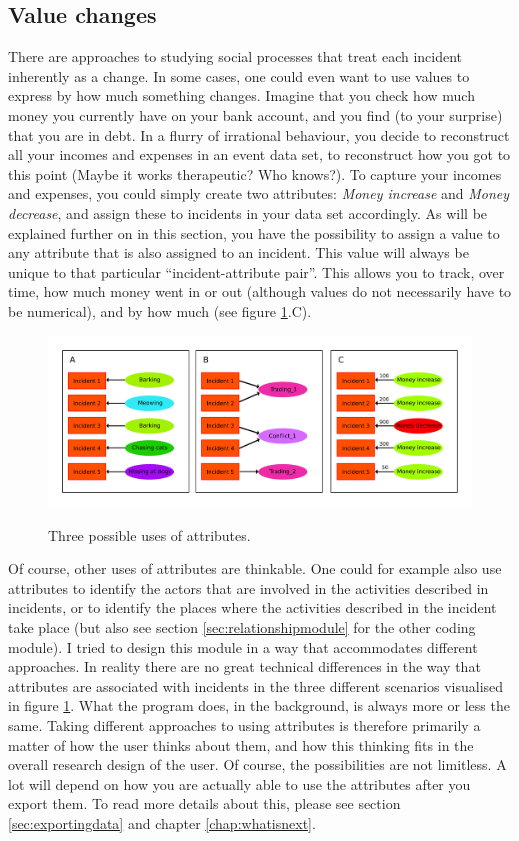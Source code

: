 \documentclass{memoir}
\begin{document}
  \subsection{Value changes}
\label{sec:valuechanges}
There are approaches to studying social processes that treat each incident inherently as a change. In some cases, one could even want to use values to express by how much something changes. Imagine that you check how much money you currently have on your bank account, and you find (to your surprise) that you are in debt. In a flurry of irrational behaviour, you decide to reconstruct all your incomes and expenses in an event data set, to reconstruct how you got to this point (Maybe it works therapeutic? Who knows?). To capture your incomes and expenses, you could simply create two attributes: \emph{Money increase} and \emph{Money decrease}, and assign these to incidents in your data set accordingly. As will be explained further on in this section, you have the possibility to assign a value to any attribute that is also assigned to an incident. This value will always be unique to that particular ``incident-attribute pair''. This allows you to track, over time, how much money went in or out (although values do not necessarily have to be numerical), and by how much (see figure \ref{fig:usesofattributes}.C).

\begin{figure}[h!]
  \centering
  \caption{Three possible uses of attributes.}
  \includegraphics[width=120mm]{Diagram_3.pdf}
  \label{fig:usesofattributes}
\end{figure}

Of course, other uses of attributes are thinkable. One could for example also use attributes to identify the actors that are involved in the activities described in incidents, or to identify the places where the activities described in the incident take place (but also see section \ref{sec:relationshipmodule} for the other coding module). I tried to design this module in a way that accommodates different approaches. In reality there are no great technical differences in the way that attributes are associated with incidents in the three different scenarios visualised in figure \ref{fig:usesofattributes}. What the program does, in the background, is always more or less the same. Taking different approaches to using attributes is therefore primarily a matter of how the user thinks about them, and how this thinking fits in the overall research design of the user. Of course, the possibilities are not limitless. A lot will depend on how you are actually able to use the attributes after you export them. To read more details about this, please see section \ref{sec:exportingdata} and chapter \ref{chap:whatisnext}.
\end{document}
